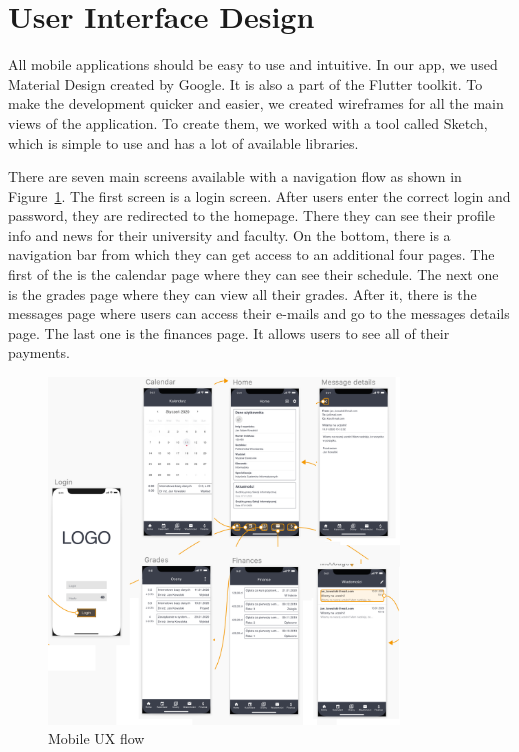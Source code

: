 \section{User Interface Design}

All mobile applications should be easy to use and intuitive. In our app, we used Material Design created by Google. It is also a part of the Flutter toolkit. To make the development quicker and easier, we created wireframes for all the main views of the application. To create them, we worked with a tool called Sketch, which is simple to use and has a lot of available libraries.

There are seven main screens available with a navigation flow as shown in Figure~\ref{fig:ux-flow}. The first screen is a login screen. After users enter the correct login and password, they are redirected to the homepage. There they can see their profile info and news for their university and faculty. On the bottom, there is a navigation bar from which they can get access to an additional four pages. The first of the is the calendar page where they can see their schedule. The next one is the grades page where they can view all their grades. After it, there is the messages page where users can access their e-mails and go to the messages details page. The last one is the finances page. It allows users to see all of their payments.
\begin{figure}[htb]
    \centering
    \includegraphics[width=0.83\textwidth]{fig03/mobile_ux_flow-1-2x3.png}
    \caption{Mobile UX flow}
    \label{fig:ux-flow}
\end{figure}

